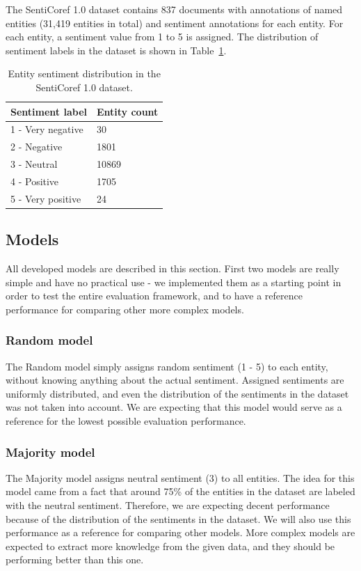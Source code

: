 \documentclass[11pt,a4paper]{article}
\begin{document}
The SentiCoref 1.0 dataset contains 837 documents with annotations of named entities (31,419 entities in total) and sentiment annotations for each entity. For each entity, a sentiment value from 1 to 5 is assigned. The distribution of sentiment labels in the dataset is shown in Table~\ref{tab:sentiment_distribution}.

\begin{table}[h]
\centering
\begin{tabular}{ll}
Sentiment label   & Entity count \\ \hline
1 - Very negative & 30           \\
2 - Negative      & 1801         \\
3 - Neutral       & 10869        \\
4 - Positive      & 1705         \\
5 - Very positive & 24          
\end{tabular}
\caption{Entity sentiment distribution in the SentiCoref 1.0 dataset.}
\label{tab:sentiment_distribution}
\end{table}

\subsection{Models}

All developed models are described in this section.
First two models are really simple and have no practical use - we implemented them as a starting point in order to test the entire evaluation framework, and to have a reference performance for comparing other more complex models.

\subsubsection{Random model}

The Random model simply assigns random sentiment (1 - 5) to each entity, without knowing anything about the actual sentiment.
Assigned sentiments are uniformly distributed, and even the distribution of the sentiments in the dataset was not taken into account.
We are expecting that this model would serve as a reference for the lowest possible evaluation performance.

\subsubsection{Majority model}

The Majority model assigns neutral sentiment (3) to all entities.
The idea for this model came from a fact that around 75\% of the entities in the dataset are labeled with the neutral sentiment.
Therefore, we are expecting decent performance because of the distribution of the sentiments in the dataset.
We will also use this performance as a reference for comparing other models.
More complex models are expected to extract more knowledge from the given data, and they should be performing better than this one.
\end{document}
